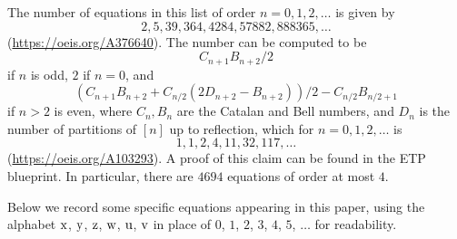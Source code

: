 The number of equations in this list of order $n=0,1,2,\dots$ is given by
$$ 2, 5, 39, 364, 4284, 57882, 888365, \dots$$
(\url{https://oeis.org/A376640}).  The number can be computed to be
$$ C_{n+1} B_{n+2}/2$$
if $n$ is odd, $2$ if $n=0$, and
$$ (C_{n+1} B_{n+2}+ C_{n/2}(2D_{n+2}-B_{n+2}))/2 - C_{n/2} B_{n/2+1}$$
if $n > 2$ is even, where $C_n, B_n$ are the Catalan and Bell numbers, and $D_n$ is the number of partitions of $[n]$ up to reflection, which for $n=0,1,2,\dots$ is
$$ 1, 1, 2, 4, 11, 32, 117, \dots$$
(\url{https://oeis.org/A103293}).  A proof of this claim can be found in the ETP blueprint.  In particular, there are $4694$ equations of order at most $4$.

Below we record some specific equations appearing in this paper, using the alphabet $\mathrm{x}$, $\mathrm{y}$, $\mathrm{z}$, $\mathrm{w}$, $\mathrm{u}$, $\mathrm{v}$ in place of $0$, $1$, $2$, $3$, $4$, $5$, $\dots$ for readability.
\begingroup\allowdisplaybreaks
